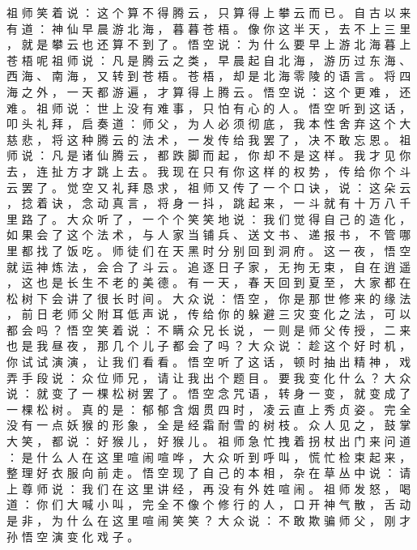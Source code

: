 {祖 师 笑 着 说 ： 这 个 算 不 得 腾 云 ， 只 算 得 上 攀 云 而 已 。
自 古 以 来 有 道 ： 神 仙 早 晨 游 北 海 ， 暮 暮 苍 梧 。
像 你 这 半 天 ， 去 不 上 三 里 ， 就 是 攀 云 也 还 算 不 到 了 。
悟 空 说 ： 为 什 么 要 早 上 游 北 海 暮 上 苍 梧 呢 祖 师 说 ： 凡 是 腾 云 之 类 ， 早 晨 起 自 北 海 ， 游 历 过 东 海 、 西 海 、 南 海 ， 又 转 到 苍 梧 。
苍 梧 ， 却 是 北 海 零 陵 的 语 言 。
将 四 海 之 外 ， 一 天 都 游 遍 ， 才 算 得 上 腾 云 。
悟 空 说 ： 这 个 更 难 ， 还 难 。
祖 师 说 ： 世 上 没 有 难 事 ， 只 怕 有 心 的 人 。
悟 空 听 到 这 话 ， 叩 头 礼 拜 ， 启 奏 道 ： 师 父 ， 为 人 必 须 彻 底 ， 我 本 性 舍 弃 这 个 大 慈 悲 ， 将 这 种 腾 云 的 法 术 ， 一 发 传 给 我 罢 了 ， 决 不 敢 忘 恩 。
祖 师 说 ： 凡 是 诸 仙 腾 云 ， 都 跌 脚 而 起 ， 你 却 不 是 这 样 。
我 才 见 你 去 ， 连 扯 方 才 跳 上 去 。
我 现 在 只 有 你 这 样 的 权 势 ， 传 给 你 个 斗 云 罢 了 。
觉 空 又 礼 拜 恳 求 ， 祖 师 又 传 了 一 个 口 诀 ， 说 ： 这 朵 云 ， 捻 着 诀 ， 念 动 真 言 ， 将 身 一 抖 ， 跳 起 来 ， 一 斗 就 有 十 万 八 千 里 路 了 。
大 众 听 了 ， 一 个 个 笑 笑 地 说 ： 我 们 觉 得 自 己 的 造 化 ， 如 果 会 了 这 个 法 术 ， 与 人 家 当 铺 兵 、 送 文 书 、 递 报 书 ， 不 管 哪 里 都 找 了 饭 吃 。
师 徒 们 在 天 黑 时 分 别 回 到 洞 府 。
这 一 夜 ， 悟 空 就 运 神 炼 法 ， 会 合 了 斗 云 。
追 逐 日 子 家 ， 无 拘 无 束 ， 自 在 逍 遥 ， 这 也 是 长 生 不 老 的 美 德 。
有 一 天 ， 春 天 回 到 夏 至 ， 大 家 都 在 松 树 下 会 讲 了 很 长 时 间 。
大 众 说 ： 悟 空 ， 你 是 那 世 修 来 的 缘 法 ， 前 日 老 师 父 附 耳 低 声 说 ， 传 给 你 的 躲 避 三 灾 变 化 之 法 ， 可 以 都 会 吗 ？ 悟 空 笑 着 说 ： 不 瞒 众 兄 长 说 ， 一 则 是 师 父 传 授 ， 二 来 也 是 我 昼 夜 ， 那 几 个 儿 子 都 会 了 吗 ？
大 众 说 ： 趁 这 个 好 时 机 ， 你 试 试 演 演 ， 让 我 们 看 看 。
悟 空 听 了 这 话 ， 顿 时 抽 出 精 神 ， 戏 弄 手 段 说 ： 众 位 师 兄 ， 请 让 我 出 个 题 目 。
要 我 变 化 什 么 ？ 大 众 说 ： 就 变 了 一 棵 松 树 罢 了 。
悟 空 念 咒 语 ， 转 身 一 变 ， 就 变 成 了 一 棵 松 树 。
真 的 是 ： 郁 郁 含 烟 贯 四 时 ， 凌 云 直 上 秀 贞 姿 。
完 全 没 有 一 点 妖 猴 的 形 象 ， 全 是 经 霜 耐 雪 的 树 枝 。
众 人 见 之 ， 鼓 掌 大 笑 ， 都 说 ： 好 猴 儿 ， 好 猴 儿 。
祖 师 急 忙 拽 着 拐 杖 出 门 来 问 道 ： 是 什 么 人 在 这 里 喧 闹 喧 哗 ， 大 众 听 到 呼 叫 ， 慌 忙 检 束 起 来 ， 整 理 好 衣 服 向 前 走 。
悟 空 现 了 自 己 的 本 相 ， 杂 在 草 丛 中 说 ： 请 上 尊 师 说 ： 我 们 在 这 里 讲 经 ， 再 没 有 外 姓 喧 闹 。
祖 师 发 怒 ， 喝 道 ： 你 们 大 喊 小 叫 ， 完 全 不 像 个 修 行 的 人 ， 口 开 神 气 散 ， 舌 动 是 非 ， 为 什 么 在 这 里 喧 闹 笑 笑 ？ 大 众 说 ： 不 敢 欺 骗 师 父 ， 刚 才 孙 悟 空 演 变 化 戏 子 。
}
